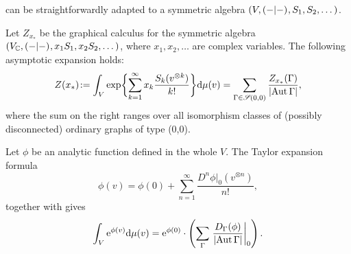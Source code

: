 
 can be straightforwardly adapted to a symmetric
algebra $(V, \inner{-}{-},\break S_1, S_2, \dots)$.
\begin{theorem}\label{thm:FRTsym}
  Let $Z_{x_*}$ be the graphical calculus for the symmetric algebra
  $(V_{\mathbb{C}}, ( -|- )_{}, x_1S_1, x_2S_2, \dots)$, where
$x_1,x_2,\dots$ are
  complex variables. The following asymptotic expansion holds:
  \begin{equation*}
    Z(x_*)\joinrel:=\int_V \exp \biggl\{ \sum_{k=1}^\infty x_k
    \frac{S_k(v\tp{k})}{k!}
    \biggr\} \ud\mu(v)
    = \sum_{\Gamma\in\SG(0,0)} \frac {Z_{x_*}(\Gamma)} {\card{\Aut\Gamma}},
  \end{equation*}
  where the sum on the right ranges over all isomorphism classes of
(possibly disconnected) ordinary graphs of type (0,0).
\end{theorem}

\begin{example} 
  Let $\phi$ be an analytic function defined in the whole $V$. The
  Taylor expansion formula
\begin{equation*}
\phi(v)=\phi(0)+\sum_{n=1}^{\infty}\frac{D^n\phi\vert_0(v^{\otimes
n})}{n!},
\end{equation*}
together with   gives
\begin{equation}
  \int_V \mathrm{e}^{\phi(v)} \mathrm{d}
  \mu(v) = \mathrm{e}^{\phi(0)} \cdot \left(\sum_\Gamma
    \left.\frac{D_\Gamma(\phi)}{\lvert\operatorname{Aut}\Gamma\rvert}\right\vert_0\right).
\end{equation}
\end{example}

